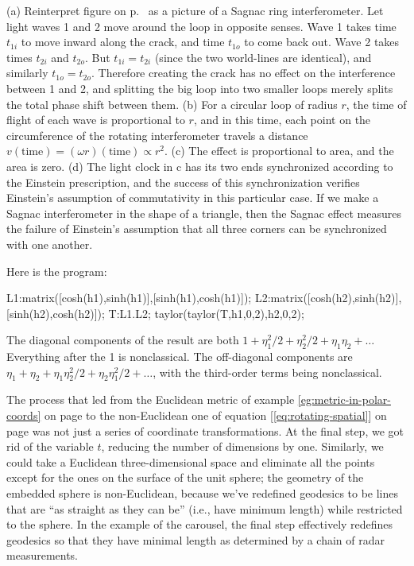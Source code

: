(a) Reinterpret figure  on p.~\pageref{fig:thomas-as-area} as a picture of a Sagnac
ring interferometer. Let light waves 1 and 2 move around the loop in opposite senses. Wave 1 takes time
$t_{1i}$ to move inward along the crack, and time $t_{1o}$ to come back out. Wave 2 takes times
$t_{2i}$ and $t_{2o}$. But $t_{1i}=t_{2i}$ (since the two world-lines are identical), and similarly
$t_{1o}=t_{2o}$. Therefore creating the crack has no effect on the interference between 1 and 2,
and splitting the big loop into two smaller loops merely splits the total phase shift between them.
(b) For a circular loop of radius $r$, the time of flight of each wave is proportional to $r$, and
in this time, each point on the circumference of the rotating interferometer travels a distance
$v(\text{time})=(\omega r)(\text{time})\propto r^2$. (c) The effect is proportional to area, and
the area is zero. (d) The light clock in c has its two ends synchronized according to the Einstein
prescription, and the success of this synchronization verifies Einstein's assumption of commutativity
in this particular case. If we make a Sagnac interferometer in the shape of a triangle, then the Sagnac
effect measures the failure of Einstein's assumption that all three corners can be synchronized
with one another.


Here is the program:
\begin{listing}{1}
L1:matrix([cosh(h1),sinh(h1)],[sinh(h1),cosh(h1)]);
L2:matrix([cosh(h2),sinh(h2)],[sinh(h2),cosh(h2)]);
T:L1.L2;
taylor(taylor(T,h1,0,2),h2,0,2);
\end{listing}
The diagonal components of the result are both $1+\eta_1^2/2+\eta_2^2/2+\eta_1\eta_2+\ldots$
Everything after the 1 is nonclassical. The 
off-diagonal components are $\eta_1+\eta_2+\eta_1\eta_2^2/2+\eta_2\eta_1^2/2+\ldots$,
with the third-order terms being nonclassical.



The process that led from the Euclidean metric of example \ref{eg:metric-in-polar-coords} on page \pageref{eg:metric-in-polar-coords}
to the non-Euclidean one of equation [\ref{eq:rotating-spatial}] on page \pageref{eq:rotating-spatial} was not just a series
of coordinate transformations. At the final step, we got rid of the variable $t$, reducing the number of dimensions by one.
Similarly, we could take a Euclidean three-dimensional space and eliminate all the points except for the ones on the surface
of the unit sphere; the geometry of the embedded sphere is non-Euclidean, because we've redefined geodesics to be lines that
are ``as straight as they can be'' (i.e., have minimum length) while restricted to the sphere. In the example of the carousel, the final step effectively
redefines geodesics so that they have minimal length as determined by a chain of radar measurements.

